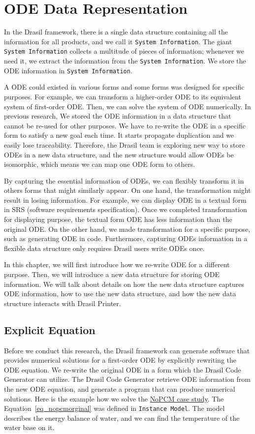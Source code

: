 \chapter{ODE Data Representation}
In the Drasil framework, there is a single data structure containing all the information for all products, and we call it \verb|System Information|. The giant \verb|System Information| collects a multitude of pieces of information; whenever we need it, we extract the information from the \verb|System Information|. We store the ODE information in \verb|System Information|. 

A ODE could existed in various forms and some forms was designed for specific purposes. For example, we can transform a higher-order ODE to its equivalent system of first-order ODE. Then, we can solve the system of ODE numerically. In previous research, We stored the ODE information in a data structure that cannot be re-used for other purposes. We have to re-write the ODE in a specific form to satisfy a new goal each time. It starts propagate duplication and we easily lose traceability. Therefore, the Drasil team is exploring new way to store ODEs in a new data structure, and the new structure would allow ODEs be isomorphic, which means we can map one ODE form to others. 

By capturing the essential information of ODEs, we can flexibly transform it in others forms that might similarly appear. On one hand, the transformation might result in losing information. For example, we can display ODE in a textual form in SRS (software requirements specification). Once we completed transformation for displaying purpose, the textual form ODE has less information than the original ODE. On the other hand, we made transformation for a specific purpose, such as generating ODE in code. Furthermore, capturing ODEs information in a flexible data structure only requires Drasil users write ODEs once.

In this chapter, we will first introduce how we re-write ODE for a different purpose. Then, we will introduce a new data structure for storing ODE information. We will talk about details on how the new data structure captures ODE information, how to use the new data structure, and how the new data structure interacts with Drasil Printer.

\section{Explicit Equation}
Before we conduct this research, the Drasil framework can generate software that provides numerical solutions for a first-order ODE by explicitly rewriting the ODE equation. We re-write the original ODE in a form which the Drasil Code Generator can utilize. The Drasil Code Generator retrieve ODE information from the new ODE equation, and generate a program that can produce numerical solutions. Here is the example how we solve the \href{https://jacquescarette.github.io/Drasil/examples/nopcm/SRS/srs/NoPCM_SRS.html#Sec:IMs}{NoPCM case study}. The Equation~\ref{eq_nopcmorginal} was defined in \verb|Instance Model|. The model describes the energy balance of water, and we can find the temperature of the water base on it.

